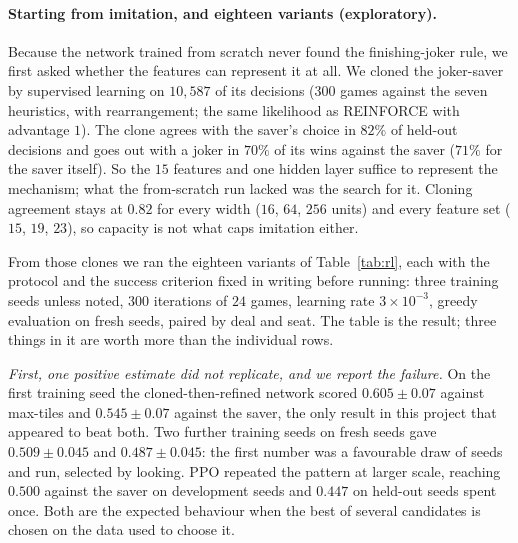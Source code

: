 \documentclass[11pt]{article}
\begin{document}
\paragraph{Starting from imitation, and eighteen variants (exploratory).} Because the network trained from scratch never found the finishing-joker rule, we first asked whether the features can represent it at all. We cloned the joker-saver by supervised learning on $10{,}587$ of its decisions ($300$ games against the seven heuristics, with rearrangement; the same likelihood as REINFORCE with advantage $1$). The clone agrees with the saver's choice in $82\%$ of held-out decisions and goes out with a joker in $70\%$ of its wins against the saver ($71\%$ for the saver itself). So the $15$ features and one hidden layer suffice to represent the mechanism; what the from-scratch run lacked was the search for it. Cloning agreement stays at $0.82$ for every width ($16$, $64$, $256$ units) and every feature set ($15$, $19$, $23$), so capacity is not what caps imitation either.

From those clones we ran the eighteen variants of Table~\ref{tab:rl}, each with the protocol and the success criterion fixed in writing before running: three training seeds unless noted, $300$ iterations of $24$ games, learning rate $3\times10^{-3}$, greedy evaluation on fresh seeds, paired by deal and seat. The table is the result; three things in it are worth more than the individual rows.

\begin{table}[t]\centering\small\setlength{\tabcolsep}{4pt}
\caption{Eighteen variants started from the clone of the joker-saver, scored by game count ($\pm$ 95\% CI; ``Games'' pools the training seeds). Rows with a signed value are paired differences against the same architecture without the change, on identical deals. Every row is exploratory except the PPO held-out row; $p$-values are not corrected across rows. Seed ranges in Section~\ref{sec:protocol}.}\label{tab:rl}

\end{table}

\emph{First, one positive estimate did not replicate, and we report the failure.} On the first training seed the cloned-then-refined network scored $0.605\pm0.07$ against max-tiles and $0.545\pm0.07$ against the saver, the only result in this project that appeared to beat both. Two further training seeds on fresh seeds gave $0.509\pm0.045$ and $0.487\pm0.045$: the first number was a favourable draw of seeds and run, selected by looking. PPO repeated the pattern at larger scale, reaching $0.500$ against the saver on development seeds and $0.447$ on held-out seeds spent once. Both are the expected behaviour when the best of several candidates is chosen on the data used to choose it.
\end{document}
